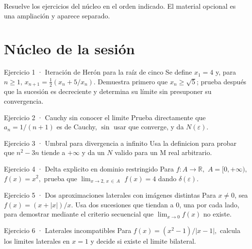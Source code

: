 \documentclass[10pt,a4paper,oneside,openany]{book}
\begin{document}
Resuelve los ejercicios del núcleo en el orden indicado. El material opcional es una ampliación y aparece separado.
\section*{Núcleo de la sesión}
\begin{PSevenExerciseFixed}{Ejercicio 1 · Iteración de Herón para la raíz de cinco}
Se define \(x_1=4\) y, para \(n\ge1\), \(x_{n+1}=\tfrac12(x_n+5/x_n)\). Demuestra primero que \(x_n\ge\sqrt5\); prueba después que la sucesión es decreciente y determina su límite sin presuponer su convergencia.
\end{PSevenExerciseFixed}
\begin{PSevenExerciseFixed}{Ejercicio 2 · Cauchy sin conocer el limite}
Prueba directamente que \(a_n=1/(n+1)\) es de Cauchy, \(\sin\) usar que converge, y da \(N(\varepsilon )\).
\end{PSevenExerciseFixed}
\begin{PSevenExerciseFixed}{Ejercicio 3 · Umbral para divergencia a infinito}
Usa la definicion para probar que \(n^{2}-3n\) tiende a \(+\infty \) y da un \(N\) valido para un M real arbitrario.
\end{PSevenExerciseFixed}
\begin{PSevenExerciseFixed}{Ejercicio 4 · Delta explicito en dominio restringido}
Para \(f:A\to \mathbb{R},\) \(A=[0,+\infty ),\) \(f(x)=x^{2},\) prueba que \(\lim_{x\to 2,\,x\,\in \,A}\) \(f(x)=4\) dando \(\delta (\varepsilon )\).
\end{PSevenExerciseFixed}
\begin{PSevenExerciseFixed}{Ejercicio 5 · Dos aproximaciones laterales con imágenes distintas}
Para \(x\ne0\), sea \(f(x)=(x+|x|)/x\). Usa dos sucesiones que tiendan a \(0\), una por cada lado, para demostrar mediante el criterio secuencial que \(\lim_{x\to0}f(x)\) no existe.
\end{PSevenExerciseFixed}
\begin{PSevenExerciseFixed}{Ejercicio 6 · Laterales incompatibles}
Para \(f(x)=(x^{2}-1)/|x-1|,\) calcula los limites laterales en \(x=1\) y decide si existe el limite bilateral.
\end{PSevenExerciseFixed}
\end{document}
